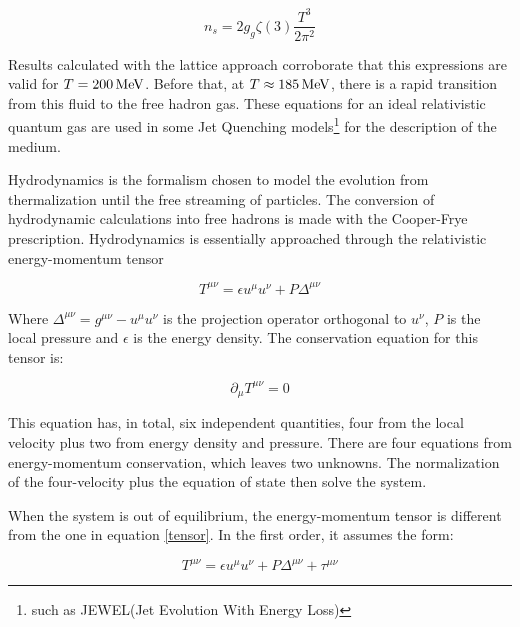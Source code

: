 \begin{equation}
n_s= 2 g_g \zeta(3) \frac{T^3}{2 \pi^2}
\end{equation}

Results calculated with the lattice \qcd approach corroborate that this expressions are valid for $T = 200 \, \rm MeV$\cite{letessier_hadrons_2002}. Before that, at $T \approx 185 \, \rm MeV$, there is a rapid transition from this fluid to the free hadron gas. These equations for an ideal relativistic quantum gas are used in some Jet Quenching models\footnote{such as JEWEL(Jet Evolution With Energy Loss)} for the description of the medium.


Hydrodynamics is the formalism chosen to model the evolution from thermalization until the free streaming of particles. The conversion of hydrodynamic calculations into free hadrons is made with the Cooper-Frye prescription. Hydrodynamics is essentially approached through the relativistic energy-momentum tensor\cite{florkowski_phenomenology_2010}

\begin{equation}
T^{\mu \nu} = \epsilon u^{\mu} u^{\nu} + P \Delta^{\mu \nu}
\label{tensor}
\end{equation}

Where $\Delta^{\mu \nu} = g^{\mu \nu} - u^\mu u^\nu$ is the projection operator orthogonal to $u^\nu$, $P$ is the local pressure and $\epsilon$ is the energy density. The conservation equation for this tensor is:

\begin{equation}
\partial_{\mu} T^{\mu \nu} = 0
\label{conservation_eq}
\end{equation}

This equation has, in total, six independent quantities, four from the local velocity plus two from energy density and pressure. There are four equations from energy-momentum conservation, which leaves two unknowns. The normalization of the four-velocity plus the equation of state then solve the system.
\par
When the system is out of equilibrium, the energy-momentum tensor is different from the one in equation \eqref{tensor}. In the first order, it assumes the form:

\begin{equation}
T^{\mu \nu} = \epsilon u^{\mu} u^{\nu} + P \Delta^{\mu \nu} + \tau^{\mu \nu}
\end{equation}

